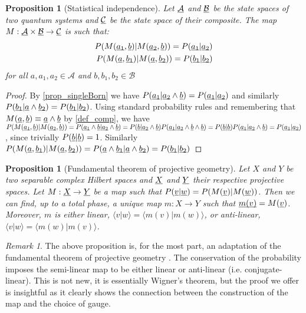 \documentclass[aps,prl,amsmath,amssymb,twocolumn,nofootinbib]{revtex4}
\theoremstyle{plain}
\newtheorem{prop}[thrm]{Proposition}
\theoremstyle{definition}
\theoremstyle{remark}
\newtheorem*{remark}{Remark}
\newcommand{\pj}[1] {\underbar{$#1$}}
\def\>{\rangle}
\def\<{\langle}
\begin{document}
	\begin{prop}[Statistical independence]\label{prop_statInd}
		Let $\pj{\mathcal{A}}$ and $\pj{\mathcal{B}}$ be the state spaces of two quantum systems and $\pj{\mathcal{C}}$ be the state space of their composite. The map $M : \pj{\mathcal{A}} \times \pj{\mathcal{B}} \to \pj{\mathcal{C}}$ is such that:
		\begin{align}
		P(M(\pj{a_1},\pj{b}) | M(\pj{a_2},\pj{b})) = P(\pj{a_1} | \pj{a_2})  \\ P(M(\pj{a},\pj{b_1}) | M(\pj{a},\pj{b_2})) = P(\pj{b_1} | \pj{b_2})
		\end{align}
		for all $a, a_1, a_2 \in \mathcal{A}$ and $b, b_1, b_2 \in \mathcal{B}$
	\end{prop}
	\begin{proof}
		By \ref{prop_singleBorn} we have $P(\pj{a_1} | \pj{a_2} \wedge \pj{b}) = P(\pj{a_1} | \pj{a_2})$ and similarly $P(\pj{b_1} | \pj{a} \wedge \pj{b_2}) = P(\pj{b_1} | \pj{b_2})$.  Using standard probability rules and remembering that $M(\pj{a},\pj{b})\equiv \pj{a} \wedge \pj{b}$ by \ref{def_comp}, we have $P(M(\pj{a_1},\pj{b}) | M(\pj{a_2},\pj{b})) = P(\pj{a_1} \wedge \pj{b} | \pj{a_2} \wedge \pj{b})  = P(\pj{b} | \pj{a_2} \wedge \pj{b}) P(\pj{a_1} | \pj{a_2} \wedge \pj{b} \wedge \pj{b})  = P(\pj{b} | \pj{b}) P(\pj{a_1} | \pj{a_2} \wedge \pj{b}) = P(\pj{a_1} | \pj{a_2})$, since trivially $P(\pj{b}|\pj{b})=1$. Similarly $P(M(\pj{a},\pj{b_1}) | M(\pj{a},\pj{b_2})) =P(\pj{a} \wedge \pj{b_1} | \pj{a} \wedge \pj{b_2}) = P(\pj{b_1} | \pj{b_2})$
	\end{proof}
	
	\begin{prop}[Fundamental theorem of projective geometry]\label{prop_fundProj}
		Let $X$ and $Y$ be two separable complex Hilbert spaces and $\pj{X}$ and $\pj{Y}$ their respective projective spaces. Let $M : \pj{X} \to \pj{Y}$ be a map such that $P(\pj{v}|\pj{w}) = P(M(\pj{v})|M(\pj{w}))$. Then we can find, up to a total phase, a unique map $m : X \to Y$ such that $\pj{m(v)}=M(\pj{v})$. Moreover, $m$ is either linear, $\<v|w\> = \<m(v)|m(w)\>$, or anti-linear, $\<v|w\> = \<m(w)|m(v)\>$.
	\end{prop}
	
	\begin{remark}
		The above proposition is, for the most part, an adaptation of the fundamental theorem of projective geometry \cite{fun}. The conservation of the probability imposes the semi-linear map to be either linear or anti-linear (i.e. conjugate-linear). This is not new, it is essentially Wigner's theorem, but the proof we offer is insightful as it clearly shows the connection between the construction of the map and the choice of gauge.
	\end{remark}
	
\end{document}
